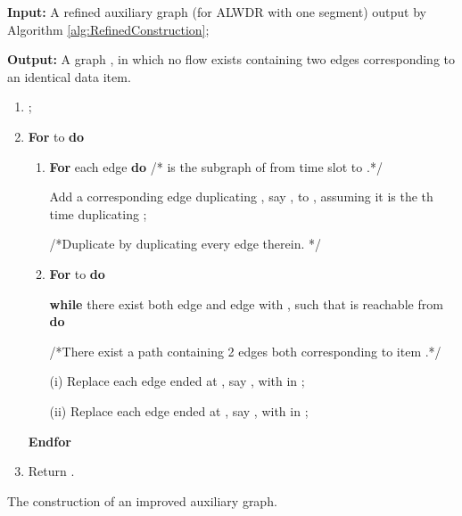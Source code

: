 \documentclass[11pt,english,onecolumn,draftcls]{IEEEtran}
\theoremstyle{plain}
\theoremstyle{plain}
\theoremstyle{plain}
\theoremstyle{plain}
\begin{document}
\begin{algorithm}
\textbf{Input: }A refined auxiliary graph  (for ALWDR
with one segment) output by Algorithm \ref{alg:RefinedConstruction};

\textbf{Output: }A graph , in which no flow exists containing
two edges corresponding to an identical data item.
\begin{enumerate}
\item ;
\item \textbf{For}  to  \textbf{do}

\begin{enumerate}
\item \textbf{For} each edge  \textbf{do
}/{*}\textbf{ }is the subgraph of  from time
slot  to .{*}/


\quad{}Add a corresponding edge duplicating , say ,
to , assuming it is the th time duplicating ;


\quad{}/{*}Duplicate  by duplicating every edge
therein. {*}/

\item \textbf{For}  to  \textbf{do}


\quad{}\textbf{while} there exist both edge 
and edge  with , such that 
is reachable from  \textbf{do}


\quad{}/{*}There exist a path containing 2 edges both corresponding
to item .{*}/


\quad{}\quad{}(i) Replace each edge ended at , say ,
with  in ;


\quad{}\quad{}(ii) Replace each edge ended at ,
say , with  in
;

\end{enumerate}

\textbf{Endfor}

\item Return .
\end{enumerate}
\protect\caption{\label{alg:enhanced-construction}The construction of an improved
auxiliary graph.}
\end{algorithm}
\end{document}
